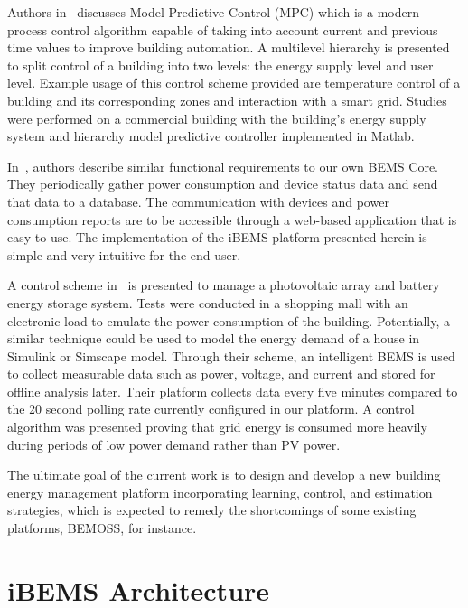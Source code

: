 \documentclass[conference]{IEEEtran}
\begin{document}
Authors in~\cite{Mayer2017} discusses Model Predictive Control (MPC)
which is a modern process control algorithm capable of taking into account
current and previous time values to improve building
automation. A multilevel hierarchy is presented to split
control of a building into two levels: the energy supply level and user level.
Example usage of this control scheme provided are temperature control of a
building and its corresponding zones and interaction with a smart grid. Studies
were performed on a commercial building with the building's energy supply system
and hierarchy model predictive controller implemented in Matlab.

In~\cite{8246800}, authors describe similar functional requirements to our
own BEMS Core. They periodically gather power consumption and device status data
and send that data to a database. The communication with devices
and power consumption reports are to be accessible through a web-based
application that is easy to use. The implementation of the iBEMS platform presented herein is simple and very
intuitive for the end-user.  

A control scheme in~\cite{Barchi2018} is presented to manage a photovoltaic
array and battery energy storage system. Tests were conducted in a shopping mall
with an electronic load to emulate the power consumption of the building.
Potentially, a similar technique could be used to model the energy demand of a
house in Simulink or Simscape model. Through their scheme, an intelligent BEMS
is used to collect measurable data such as power, voltage, and current and stored for offline analysis later. Their platform collects data every five minutes compared to the 20 second polling rate currently configured in our platform. A control algorithm was presented proving that grid energy is consumed more heavily during periods of low power demand rather than PV power.



The ultimate goal of the current work is to design and develop a new building energy management
platform incorporating learning, control, and estimation strategies, which is expected to remedy the
shortcomings of some existing platforms, BEMOSS, for instance.

\section{iBEMS Architecture}
\label{sec:iBEMS-Architecture}
\end{document}
